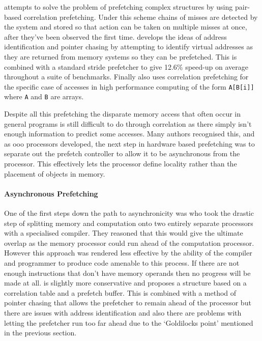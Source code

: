 \citet{solihinUsingUserlevelMemory2002} attempts to solve the problem of prefetching complex structures by using pair-based correlation prefetching. Under this scheme chains of misses are detected by the system and stored so that action can be taken on multiple misses at once, after they've been observed the first time. \citet{cookseyStatelessContentdirectedData2002a} develops the ideas of address identification and pointer chasing by attempting to identify virtual addresses as they are returned from memory systems so they can be prefetched. This is combined with a standard stride prefetcher to give 12.6\% speed-up on average throughout a suite of benchmarks. Finally \citet{yuIMPIndirectMemory2015} also uses correlation prefetching for the specific case of accesses in high performance computing of the form \texttt{A[B[i]]} where \texttt{A} and \texttt{B} are arrays.

Despite all this prefetching the disparate memory access that often occur in general programs is still difficult to do through correlation as there simply isn't enough information to predict some accesses. Many authors recognised this, and as \gls{ooo} processors developed, the next step in hardware based prefetching was to separate out the prefetch controller to allow it to be asynchronous from the processor. This  effectively lets the processor define locality rather than the placement of objects in memory.

\paragraph{Asynchronous Prefetching}

One of the first steps down the path to asynchronicity was \citet{veidenbaumDecoupledAccessDRAM1997} who took the drastic step of splitting memory and computation onto two entirely separate processors with a specialised compiler. They reasoned that this would give the ultimate overlap as the memory processor could run ahead of the computation processor. However this approach was rendered less effective by the ability of the compiler and programmer to produce code amenable to this process. If there are not enough instructions that don't have memory operands then no progress will be made at all. \citet{rothDependenceBasedPrefetching1998} is slightly more conservative and proposes a structure based on a correlation table and a prefetch buffer. This is combined with a method of pointer chasing that allows the prefetcher to remain ahead of the processor but there are issues with address identification and also there are problems with letting the prefetcher run too far ahead due to the `Goldilocks point' mentioned in the previous section.

